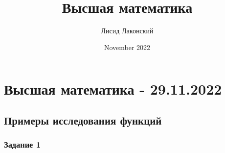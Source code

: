 \documentclass{article}
\title{Высшая математика}
\author{Лисид Лаконский}
\date{November 2022}
\begin{document}
\maketitle

\tableofcontents
\pagebreak

\section{Высшая математика - 29.11.2022}

\subsection{Примеры исследования функций}

\subsubsection{Задание 1}
\end{document}
